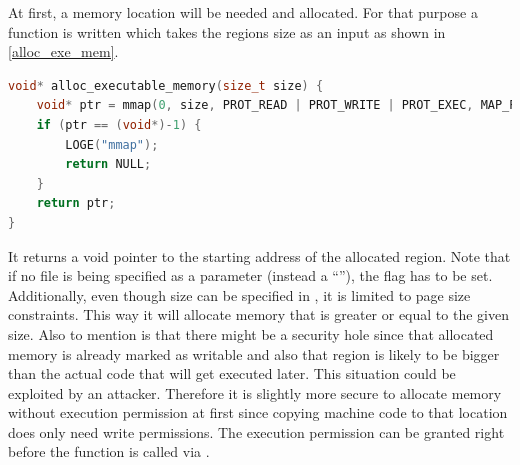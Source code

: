 At first, a memory location will be needed and allocated.
For that purpose a function is written which takes the regions size as an input as shown in \autoref{alloc_exe_mem}.
\begin{lstlisting}[language=C++, caption=alloc\_executable\_memory(), label=alloc_exe_mem]
void* alloc_executable_memory(size_t size) {
    void* ptr = mmap(0, size, PROT_READ | PROT_WRITE | PROT_EXEC, MAP_PRIVATE | MAP_ANONYMOUS, -1, 0);
    if (ptr == (void*)-1) {
        LOGE("mmap");
        return NULL;
    }
    return ptr;
}
\end{lstlisting}
It returns a void pointer to the starting address of the allocated region. Note that
if no file is being specified as a  parameter (instead a ``''),
the  flag has to be set. Additionally, even though size can be specified in , it is limited to page size constraints. This way it will allocate
memory that is greater or equal to the given size. Also to mention is that there might be a security hole since that allocated memory is already marked as writable
and also that region is likely to be bigger than the actual code that will get
executed later. This situation could be exploited by an attacker. Therefore it is slightly more secure to allocate memory without execution permission at first since copying machine code to that location does only need write
permissions. The execution permission can be granted right before the function is called via .

